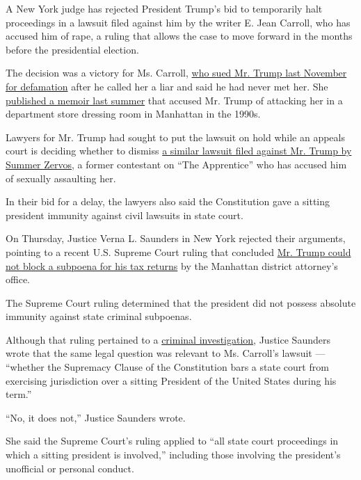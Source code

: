 A New York judge has rejected President Trump's bid to temporarily halt
proceedings in a lawsuit filed against him by the writer E. Jean
Carroll, who has accused him of rape, a ruling that allows the case to
move forward in the months before the presidential election.

The decision was a victory for Ms. Carroll,
\href{https://www.nytimes.com/2019/11/04/nyregion/jean-carroll-sues-trump.html}{who
sued Mr. Trump last November for defamation} after he called her a liar
and said he had never met her. She
\href{https://www.nytimes.com/2019/06/21/books/e-jean-carroll-trump.html}{published
a memoir last summer} that accused Mr. Trump of attacking her in a
department store dressing room in Manhattan in the 1990s.

Lawyers for Mr. Trump had sought to put the lawsuit on hold while an
appeals court is deciding whether to dismiss
\href{https://www.nytimes.com/2017/01/17/us/former-apprentice-contestant-files-defamation-suit-against-trump.html}{a
similar lawsuit filed against Mr. Trump by Summer Zervos}, a former
contestant on ``The Apprentice'' who has accused him of sexually
assaulting her.

In their bid for a delay, the lawyers also said the Constitution gave a
sitting president immunity against civil lawsuits in state court.

On Thursday, Justice Verna L. Saunders in New York rejected their
arguments, pointing to a recent U.S. Supreme Court ruling that concluded
\href{https://www.nytimes.com/2020/07/09/us/trump-taxes-supreme-court.html}{Mr.
Trump could not block a subpoena for his tax returns} by the Manhattan
district attorney's office.

The Supreme Court ruling determined that the president did not possess
absolute immunity against state criminal subpoenas.

Although that ruling pertained to a
\href{https://www.nytimes.com/2020/08/03/nyregion/donald-trump-taxes-cyrus-vance.html}{criminal
investigation}, Justice Saunders wrote that the same legal question was
relevant to Ms. Carroll's lawsuit --- ``whether the Supremacy Clause of
the Constitution bars a state court from exercising jurisdiction over a
sitting President of the United States during his term.''

``No, it does not,'' Justice Saunders wrote.

She said the Supreme Court's ruling applied to ``all state court
proceedings in which a sitting president is involved,'' including those
involving the president's unofficial or personal conduct.

